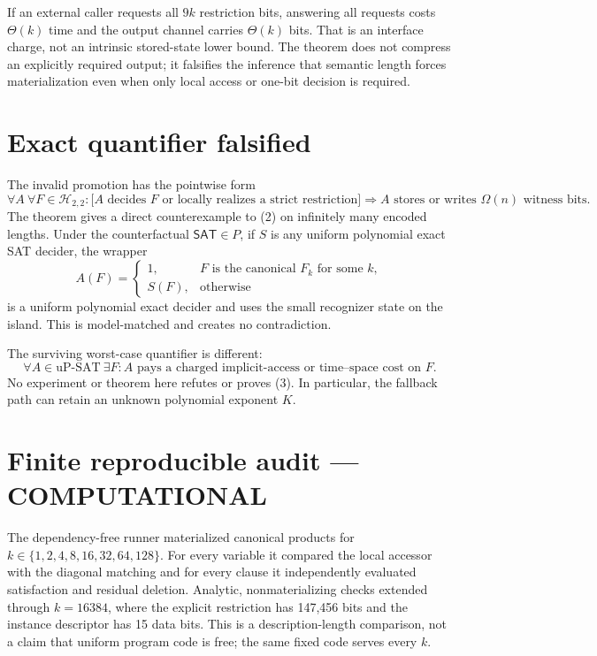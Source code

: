 \documentclass[11pt]{article}
\newcommand{\SAT}{\mathsf{SAT}}
\newcommand{\COMP}{\textbf{COMPUTATIONAL}}
\begin{document}
If an external caller requests all $9k$ restriction bits, answering all
requests costs $\Theta(k)$ time and the output channel carries $\Theta(k)$
bits.  That is an interface charge, not an intrinsic stored-state lower
bound.  The theorem does not compress an explicitly required output; it
falsifies the inference that semantic length forces materialization even
when only local access or one-bit decision is required.

\section{Exact quantifier falsified}
The invalid promotion has the pointwise form
\[
 \forall A\ \forall F\in\mathcal H_{2,2}:
 \bigl[\text{$A$ decides $F$ or locally realizes a strict restriction}\bigr]
 \Rightarrow \text{$A$ stores or writes $\Omega(n)$ witness bits}.
 \tag{2}
\]
The theorem gives a direct counterexample to (2) on infinitely many encoded
lengths.  Under the counterfactual $\SAT\in P$, if $S$ is any uniform
polynomial exact SAT decider, the wrapper
\[
 A(F)=\begin{cases}
 1,&F\text{ is the canonical }F_k\text{ for some }k,\\
 S(F),&\text{otherwise}
 \end{cases}
\]
is a uniform polynomial exact decider and uses the small recognizer state on
the island.  This is model-matched and creates no contradiction.

The surviving worst-case quantifier is different:
\[
 \forall A\in\mathrm{uP\text{-}SAT}\ \exists F:
 \text{$A$ pays a charged implicit-access or time--space cost on $F$}.
 \tag{3}
\]
No experiment or theorem here refutes or proves (3).  In particular, the
fallback path can retain an unknown polynomial exponent $K$.

\section{Finite reproducible audit --- \COMP}
The dependency-free runner materialized canonical products for
$k\in\{1,2,4,8,16,32,64,128\}$.  For every variable it compared the local
accessor with the diagonal matching and for every clause it independently
evaluated satisfaction and residual deletion.  Analytic, nonmaterializing
checks extended through $k=16384$, where the explicit restriction has
147,456 bits and the instance descriptor has 15 data bits.  This is a
description-length comparison, not a claim that uniform program code is free;
the same fixed code serves every $k$.
\end{document}

